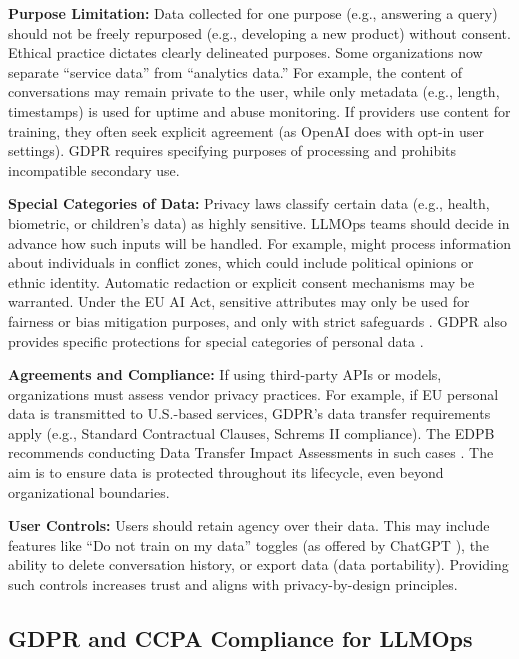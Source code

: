 \textbf{Purpose Limitation:} Data collected for one purpose (e.g., answering a query) should not be freely repurposed (e.g., developing a new product) without consent. Ethical practice dictates clearly delineated purposes. Some organizations now separate ``service data'' from ``analytics data.'' For example, the content of conversations may remain private to the user, while only metadata (e.g., length, timestamps) is used for uptime and abuse monitoring. If providers use content for training, they often seek explicit agreement (as OpenAI does with opt-in user settings). GDPR requires specifying purposes of processing and prohibits incompatible secondary use.

\textbf{Special Categories of Data:} Privacy laws classify certain data (e.g., health, biometric, or children's data) as highly sensitive. LLMOps teams should decide in advance how such inputs will be handled. For example, \ishtar{} might process information about individuals in conflict zones, which could include political opinions or ethnic identity. Automatic redaction or explicit consent mechanisms may be warranted. Under the EU AI Act, sensitive attributes may only be used for fairness or bias mitigation purposes, and only with strict safeguards \cite{euai2025,eu_ai_act_policy_page}. GDPR also provides specific protections for special categories of personal data \cite{edpb2022}.

\textbf{Agreements and Compliance:} If using third-party APIs or models, organizations must assess vendor privacy practices. For example, if EU personal data is transmitted to U.S.-based services, GDPR's data transfer requirements apply (e.g., Standard Contractual Clauses, Schrems II compliance). The EDPB recommends conducting Data Transfer Impact Assessments in such cases \cite{edpb2022}. The aim is to ensure data is protected throughout its lifecycle, even beyond organizational boundaries.

\textbf{User Controls:} Users should retain agency over their data. This may include features like ``Do not train on my data'' toggles (as offered by ChatGPT \cite{altexsoft2023}), the ability to delete conversation history, or export data (data portability). Providing such controls increases trust and aligns with privacy-by-design principles.

\subsection{GDPR and CCPA Compliance for LLMOps}\label{sec:ch11_privacy_expanded}

